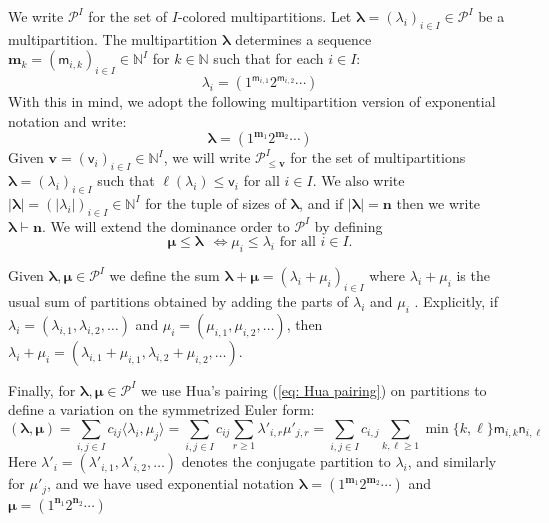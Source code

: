 \documentclass[11pt,reqno]{amsart}
\renewcommand{\mathbf}{\mathbold}
\numberwithin{equation}{section}
\theoremstyle{definition}
\newcommand{\cP}{\mathcal{P}}
\newcommand{\bm}{\mathbf{m}}
\newcommand{\bn}{\mathbf{n}}
\newcommand{\bv}{\mathbf{v}}
\newcommand{\NN}{\mathbb{N}}
\renewcommand{\bv}{\mathbf{v}} %
\newcommand{\sv}{\mathsf{v}}
\newcommand{\sm}{\mathsf{m}}
\newcommand{\sn}{\mathsf{n}}
\newcommand{\vertexset}{I}
\newcommand{\Partitions}{\cP}
\newcommand{\la}{\lambda}
\newcommand{\bla}{{\boldsymbol{\lambda}}}
\newcommand{\bmu}{{\boldsymbol{\mu}}}
\begin{document}
We write $\Partitions^{\vertexset}$ for the set of $I$-colored multipartitions. Let $ \bla = (\la_i)_{i \in \vertexset} \in \Partitions^{\vertexset}$ be a multipartition.  The multipartition $\bla$ determines a sequence $\bm_k = (\sm_{i, k})_{i \in \vertexset} \in \NN^\vertexset$ for $k \in \NN$ such that for each $i \in \vertexset$:
\begin{equation}
  \label{eq:10}
 \la_i = (1^{\sm_{i,1}} 2^{\sm_{i,2}} \cdots) 
\end{equation}
With this in mind, we adopt the following multipartition version of exponential notation and write: 
\begin{equation}
\label{eq: product exponential notation}
\bla = (1^{\bm_1} 2^{\bm_2} \cdots) 
\end{equation}
Given $\bv = (\sv_i)_{i \in \vertexset} \in \NN^\vertexset$, we will write $\Partitions^\vertexset_{\leq \bv}$ for the set of multipartitions $\bla = (\la_i)_{i \in \vertexset}$ such that $\ell(\la_i)\leq \sv_i$ for all $i\in \vertexset$.  We also write $|\bla| = (|\la_i|)_{i\in \vertexset} \in \NN^\vertexset$ for the tuple of sizes of $\bla$, and if $|\bla| = \bn$ then we write $\bla \vdash \bn$. We will extend the dominance order to $\Partitions^\vertexset$ by defining
\begin{equation}
\label{eq: product dominance order}
\bmu \leq \bla \ \ \Longleftrightarrow \mu_i \leq \la_i \text{ for all }i \in \vertexset.
\end{equation}

Given $\bla, \bmu \in \Partitions^\vertexset$ we define the sum $\bla + \bmu = (\lambda_i + \mu_i)_{i\in I}$ where $\lambda_i + \mu_i$ is the usual sum of partitions obtained by adding the parts of $\lambda_i$ and $\mu_i$ . Explicitly, if $\lambda_i = (\lambda_{i,1},\lambda_{i,2},\ldots)$ and $\mu_i = (\mu_{i,1},\mu_{i,2},\ldots)$, then $\lambda_i + \mu_i = (\lambda_{i,1}+ \mu_{i,1}, \lambda_{i,2} + \mu_{i,2}, \ldots)$.


Finally, for $\bla, \bmu \in \Partitions^\vertexset$ we use Hua's pairing (\ref{eq: Hua pairing}) on partitions to define a variation on the symmetrized Euler form: 
\begin{equation}
\label{eq: pairing on tuples of partitions}
( \bla, \bmu)  =  \sum_{i,j \in \vertexset} c_{ij} \langle \la_i, \mu_j \rangle   = \sum_{i,j \in \vertexset}c_{ij} \sum_{r \geq 1}  \la'_{i,r} \mu'_{j,r}  = \sum_{i,j \in \vertexset} c_{i,j}  \sum_{k,\ell \geq 1}\min\{ k, \ell\} \sm_{i,k} \sn_{i,\ell}
\end{equation}
Here $\la'_i = (\la'_{i,1}, \la'_{i,2},\ldots)$ denotes the conjugate partition to $\la_i$, and similarly for $\mu'_j$, and we have used exponential notation $\bla = (1^{\bm_1} 2^{\bm_2}\cdots)$ and $\bmu = (1^{\bn_1} 2^{\bn_2}\cdots)$ 
\end{document}
